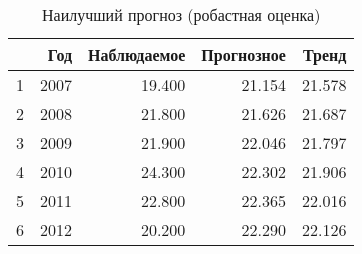 \begin{table}[ht]
\centering
\begin{tabular}{rrrrr}
  \hline
 & Год & Наблюдаемое & Прогнозное & Тренд \\ 
  \hline
1 & 2007 & 19.400 & 21.154 & 21.578 \\ 
  2 & 2008 & 21.800 & 21.626 & 21.687 \\ 
  3 & 2009 & 21.900 & 22.046 & 21.797 \\ 
  4 & 2010 & 24.300 & 22.302 & 21.906 \\ 
  5 & 2011 & 22.800 & 22.365 & 22.016 \\ 
  6 & 2012 & 20.200 & 22.290 & 22.126 \\ 
   \hline
\end{tabular}
\caption{Наилучший прогноз (робастная оценка)} 
\label{table:prediction-robust-best}
\end{table}
